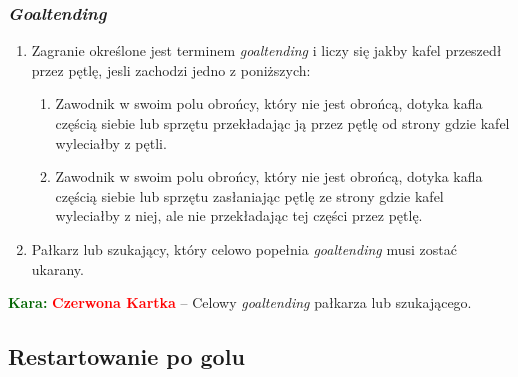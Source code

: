 \documentclass[11pt,a4paper]{article}
\newcommand\redcard[1]{\bgroup\textcolor{darkgreen}{\textbf{Kara: }}\bgroup\textcolor{red}{\textbf{Czerwona Kartka}} -- #1}
\begin{document}
\subsubsection{\emph{Goaltending}}
\begin{enumerate}
  \item Zagranie określone jest terminem \emph{goaltending} i liczy się jakby kafel przeszedł przez pętlę, jesli zachodzi jedno z poniższych:
  \begin{enumerate}
    \item Zawodnik w swoim polu obrońcy, który nie jest obrońcą, dotyka kafla częścią siebie lub sprzętu przekładając ją przez pętlę od strony gdzie kafel wyleciałby z pętli.
    \item Zawodnik w swoim polu obrońcy, który nie jest obrońcą, dotyka kafla częścią siebie lub sprzętu zasłaniając pętlę ze strony gdzie kafel wyleciałby z niej, ale nie przekładając tej części przez pętlę.
  \end{enumerate}
  \item Pałkarz lub szukający, który celowo popełnia \emph{goaltending} musi zostać ukarany.
\end{enumerate}

\redcard{Celowy \emph{goaltending} pałkarza lub szukającego.}

\subsection{Restartowanie po golu}
\end{document}
